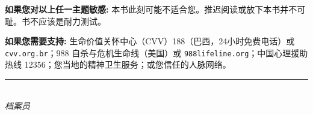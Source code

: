 \vspace{1em}

\noindent \textbf{如果您对以上任一主题敏感:} 本书此刻可能不适合您。推迟阅读或放下本书并不可耻。书不应该是耐力测试。

\vspace{1em}

\noindent \textbf{如果您需要支持:} 生命价值关怀中心（CVV）188（巴西，24小时免费电话）或 \texttt{cvv.org.br}；988 自杀与危机生命线（美国）或 \texttt{988lifeline.org}；中国心理援助热线 12356；您当地的精神卫生服务；或您信任的人脉网络。

\vspace{2.2em}
\begin{center}
{\color{sangue}\rule{0.4\paperwidth}{0.6pt}}\\[1em]
{\small\itshape 档案员}
\end{center}
\endgroup
\null\vfill
\clearpage

